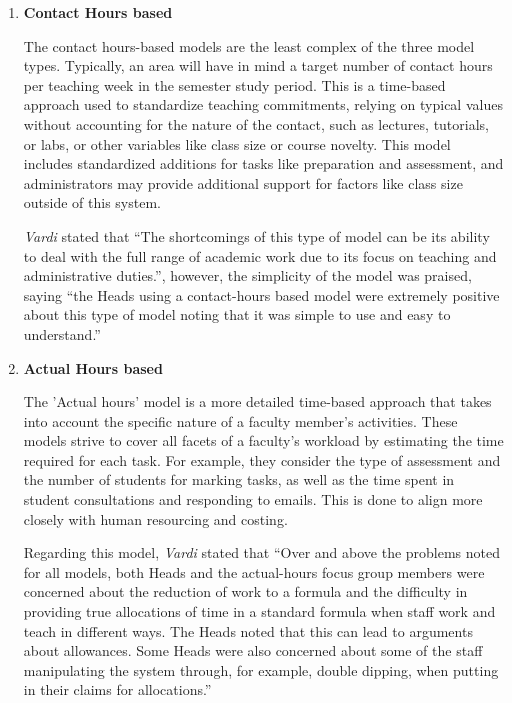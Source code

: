 \begin{enumerate}

  \item \textbf{Contact Hours based}

        The contact hours-based models are the least complex of the three model types. Typically, an area will have in mind a target number of contact hours per teaching week in the semester study period. This is a time-based approach used to standardize teaching commitments, relying on typical values without accounting for the nature of the contact, such as lectures, tutorials, or labs, or other variables like class size or course novelty. This model includes standardized additions for tasks like preparation and assessment, and administrators may provide additional support for factors like class size outside of this system.

        \textit{Vardi} stated that ``The shortcomings of this type of model can be its ability to deal with the full range of academic work due to its focus on teaching and administrative duties.'', however, the simplicity of the model was praised, saying ``the Heads using a contact-hours based model were extremely positive about this type of model noting that it was simple to use and easy to understand.'' \cite{vardi2009impacts}

  \item \textbf{Actual Hours based}

        The 'Actual hours' model is a more detailed time-based approach that takes into account the specific nature of a faculty member's activities. These models strive to cover all facets of a faculty's workload by estimating the time required for each task. For example, they consider the type of assessment and the number of students for marking tasks, as well as the time spent in student consultations and responding to emails. This is done to align more closely with human resourcing and costing.

        Regarding this model, \textit{Vardi} stated that ``Over and above the problems noted for all models, both Heads and the actual-hours focus group members were concerned about the reduction of work to a formula and the difficulty in providing true allocations of time in a standard formula when staff work and teach in different ways. The Heads noted that this can lead to arguments about allowances.
        Some Heads were also concerned about some of the staff manipulating the system through, for example, double dipping, when putting in their claims for allocations.'' \cite{vardi2009impacts}


\end{enumerate}
